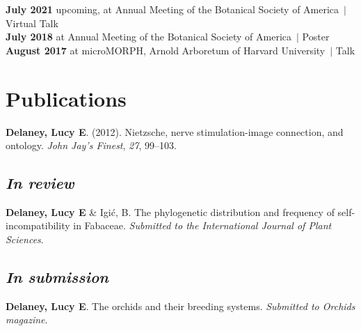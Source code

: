 \documentclass[]{article}
\newlength{\cslhangindent}
\newenvironment{cslreferences}
{\setlength{\parindent}{0pt}
\everypar{\setlength{\hangindent}{\cslhangindent}}\ignorespaces}
{\par}
\begin{document}
\textbf{July 2021} upcoming, at Annual Meeting of the Botanical Society of America\ $\vert$ Virtual Talk \hspace{0.1mm} \href{https://ledelaney.org/talks/2021botany}{\faImages} \href{https://github.com/ledelaney/07-21-Botany}{\faGithub}\\
\textbf{July 2018} at Annual Meeting of the Botanical Society of America\ $\vert$ Poster \hspace{0.4mm} \href{https://ledelaney.org/static/posters/poster.png}{\faFileImage}\\
\textbf{August 2017} at microMORPH, Arnold Arboretum of Harvard University\ $\vert$ Talk \hspace{0.4mm} \href{https://www.dropbox.com/s/o7hcg5riw97wf9i/08-2017-microMORPH.pdf?dl=1}{\faImages}



\section{\fontsize{16}{48}\selectfont Publications}

\begin{cslreferences}
\textbf{Delaney, Lucy E}. (2012). Nietzsche, nerve stimulation-image connection, and ontology. \emph{John Jay's Finest}, \emph{27}, 99--103. \href{https://ledelaney.org/static/docs/Delaney-JJAYFinest.pdf}{\faFile}\\
\end{cslreferences}

\vspace{-10mm}

\subsection{\fontsize{12}{36}\selectfont \textit{In review}}
\vspace{-2mm}
\begin{cslreferences}
\textbf{Delaney, Lucy E} \& Igić, B. The phylogenetic distribution and frequency of self-incompatibility in Fabaceae. \textit{Submitted to the International Journal of Plant Sciences}.
\end{cslreferences}
\vspace{-4mm}

\subsection{\fontsize{12}{36}\selectfont \textit{In submission}}
\vspace{-2mm}
\begin{cslreferences}

\textbf{Delaney, Lucy E}. The orchids and their breeding systems. \textit{Submitted to Orchids magazine}.
\end{cslreferences}
\end{document}
